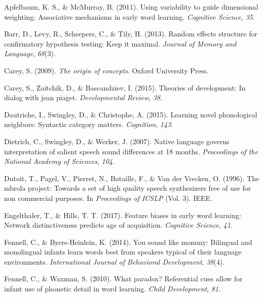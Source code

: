 \documentclass[english,,man]{apa6}
\begin{document}
\leavevmode\hypertarget{ref-apfelbaum2011}{}%
Apfelbaum, K. S., \& McMurray, B. (2011). Using variability to guide dimensional weighting: Associative mechanisms in early word learning. \emph{Cognitive Science}, \emph{35}.

\leavevmode\hypertarget{ref-barr2013}{}%
Barr, D., Levy, R., Scheepers, C., \& Tily, H. (2013). Random effects structure for confirmatory hypothesis testing: Keep it maximal. \emph{Journal of Memory and Language}, \emph{68}(3).

\leavevmode\hypertarget{ref-carey2009}{}%
Carey, S. (2009). \emph{The origin of concepts}. Oxford University Press.

\leavevmode\hypertarget{ref-carey2015}{}%
Carey, S., Zaitchik, D., \& Bascandziev, I. (2015). Theories of development: In dialog with jean piaget. \emph{Developmental Review}, \emph{38}.

\leavevmode\hypertarget{ref-dautriche2015}{}%
Dautriche, I., Swingley, D., \& Christophe, A. (2015). Learning novel phonological neighbors: Syntactic category matters. \emph{Cognition}, \emph{143}.

\leavevmode\hypertarget{ref-dietrich2007}{}%
Dietrich, C., Swingley, D., \& Werker, J. (2007). Native language governs interpretation of salient speech sound differences at 18 months. \emph{Proceedings of the National Academy of Sciences}, \emph{104}.

\leavevmode\hypertarget{ref-dutoit1996}{}%
Dutoit, T., Pagel, V., Pierret, N., Bataille, F., \& Van der Vrecken, O. (1996). The mbrola project: Towards a set of high quality speech synthesizers free of use for non commercial purposes. In \emph{Proceedings of ICSLP} (Vol. 3). IEEE.

\leavevmode\hypertarget{ref-engelthaler2017}{}%
Engelthaler, T., \& Hills, T. T. (2017). Feature biases in early word learning: Network distinctiveness predicts age of acquisition. \emph{Cognitive Science}, \emph{41}.

\leavevmode\hypertarget{ref-Fennell2014}{}%
Fennell, C., \& Byers-Heinlein, K. (2014). You sound like mommy: Bilingual and monolingual infants learn words best from speakers typical of their language environments. \emph{International Journal of Behavioral Development}, \emph{38}(4).

\leavevmode\hypertarget{ref-fennell2010}{}%
Fennell, C., \& Waxman, S. (2010). What paradox? Referential cues allow for infant use of phonetic detail in word learning. \emph{Child Development}, \emph{81}.
\end{document}
